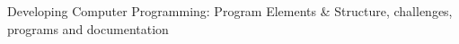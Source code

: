 Developing Computer Programming\+: Program Elements \& Structure, challenges, programs and documentation 